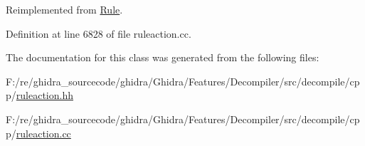 Reimplemented from \mbox{\hyperlink{class_rule_a4023bfc7825de0ab866790551856d10e}{Rule}}.



Definition at line 6828 of file ruleaction.\+cc.



The documentation for this class was generated from the following files\+:\begin{DoxyCompactItemize}
\item 
F\+:/re/ghidra\+\_\+sourcecode/ghidra/\+Ghidra/\+Features/\+Decompiler/src/decompile/cpp/\mbox{\hyperlink{ruleaction_8hh}{ruleaction.\+hh}}\item 
F\+:/re/ghidra\+\_\+sourcecode/ghidra/\+Ghidra/\+Features/\+Decompiler/src/decompile/cpp/\mbox{\hyperlink{ruleaction_8cc}{ruleaction.\+cc}}\end{DoxyCompactItemize}

